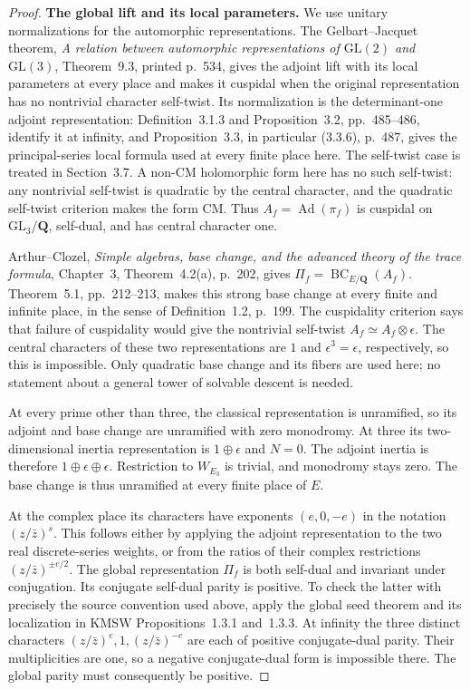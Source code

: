 \documentclass[11pt,a4paper]{article}
\theoremstyle{definition}
\renewcommand{\paragraph}[1]{\par\smallskip\noindent\textbf{#1}\quad\ignorespaces}
\begin{document}
\begin{proof}
\paragraph{The global lift and its local parameters.}
We use unitary normalizations for the automorphic representations.
The Gelbart--Jacquet theorem, \emph{A relation between automorphic
representations of $\mathrm{GL}(2)$ and $\mathrm{GL}(3)$},
Theorem~9.3, printed p.~534, gives the adjoint lift with its local
parameters at every place and makes it cuspidal when the original
representation has no nontrivial character self-twist.  Its
normalization is the determinant-one adjoint representation:
Definition~3.1.3 and Proposition~3.2, pp.~485--486, identify it
at infinity, and Proposition~3.3, in particular (3.3.6), p.~487,
gives the principal-series local formula used at every finite
place here.  The self-twist case is treated in Section~3.7.
A non-CM holomorphic form here has no such self-twist:
any nontrivial self-twist is quadratic by the central character,
and the quadratic self-twist criterion makes the form CM.
Thus $A_f=\operatorname{Ad}(\pi_f)$ is cuspidal on
$\mathrm{GL}_3/\mathbf Q$, self-dual, and has central character one.

Arthur--Clozel, \emph{Simple algebras, base change, and the
advanced theory of the trace formula}, Chapter~3,
Theorem~4.2(a), p.~202, gives
$\Pi_f=\operatorname{BC}_{E/\mathbf Q}(A_f)$.
Theorem~5.1, pp.~212--213, makes this strong base change at
every finite and infinite place, in the sense of Definition~1.2,
p.~199.  The cuspidality criterion says that failure of
cuspidality would give the
nontrivial self-twist $A_f\simeq A_f\otimes\epsilon$.
The central characters of these two representations are $1$
and $\epsilon^3=\epsilon$, respectively, so this is impossible.
Only quadratic base change and its fibers are used here;
no statement about a general tower of solvable descent is needed.

At every prime other than three, the classical representation
is unramified, so its adjoint and base change are unramified
with zero monodromy.  At three its two-dimensional inertia
representation is $1\oplus\epsilon$ and $N=0$.  The adjoint
inertia is therefore $1\oplus\epsilon\oplus\epsilon$.
Restriction to $W_{E_3}$ is trivial, and monodromy stays zero.
The base change is thus unramified at every finite place of $E$.

At the complex place its characters have exponents
$(e,0,-e)$ in the notation $(z/\bar z)^s$.  This follows either
by applying the adjoint representation to the two real
discrete-series weights, or from the ratios of their complex
restrictions $(z/\bar z)^{\pm e/2}$.
The global representation $\Pi_f$ is both self-dual and invariant
under conjugation.  Its conjugate self-dual parity is positive.
To check the latter with precisely the source convention used
above, apply the global seed theorem and its localization in
KMSW Propositions~1.3.1 and~1.3.3.  At infinity the three
distinct characters $(z/\bar z)^e,1,(z/\bar z)^{-e}$
are each of positive conjugate-dual parity.  Their multiplicities
are one, so a negative conjugate-dual form is impossible there.
The global parity must consequently be positive.


\end{proof}
\end{document}
